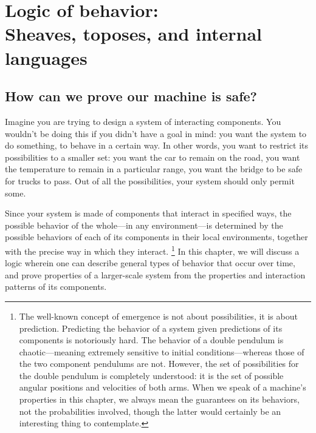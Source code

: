 \documentclass[7Sketches]{subfiles}
\begin{document}
\setcounter{chapter}{6}%
\chapter[Logic of behavior: Sheaves, toposes, languages]{Logic of behavior:\\Sheaves, toposes, and internal languages}%
\label{chap.temporal_topos}




\section{How can we prove our machine is safe?}%
\label{sec.safe_machines}

Imagine you are trying to design a system of interacting components. You
wouldn't be doing this if you didn't have a goal in mind: you want the system to
do something, to behave in a certain way. In other words, you want to restrict
its possibilities to a smaller set: you want the car to remain on the road, you
want the temperature to remain in a particular range, you want the bridge to be safe for
trucks to pass. Out of all the possibilities, your system should only permit some.

Since your system is made of components that interact in specified ways, the possible behavior of the whole---in any environment---is determined by the possible behaviors of each of its components in their local environments, together with the precise way in which they interact.%
\footnote{
The well-known concept of emergence is not about possibilities, it is about
prediction. Predicting the behavior of a system given predictions of its
components is notoriously hard. The behavior of a double pendulum is
chaotic---meaning extremely sensitive to initial conditions---whereas those of
the two component pendulums are not. However, the set of possibilities for the
double pendulum is completely understood: it is the set of possible angular
positions and velocities of both arms. When we speak of a machine's properties
in this chapter, we always mean the guarantees on its behaviors, not the
probabilities involved, though the latter would certainly be an interesting
thing to contemplate.%
}
In this chapter, we will discuss a logic wherein one can describe general types
of behavior that occur over time, and prove properties of a larger-scale system
from the properties and interaction patterns of its components.%
%
\end{document}
